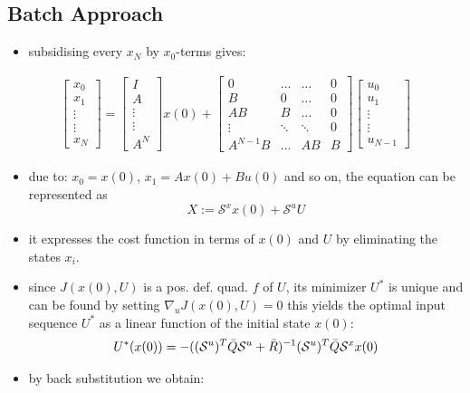 \subsection{Batch Approach}
\begin{itemize}
    \item subsidising every $x_N$ by $x_0$-terms gives:
    \end{itemize}
    \begin{align*}
        \begin{bmatrix}
            x_0     \\
            x_1     \\
            \vdots  \\
            \vdots  \\
            x_N
        \end{bmatrix} 
        =
        \begin{bmatrix}
            I \\
            A\\
            \vdots\\
            \vdots\\
            A^N
        \end{bmatrix} x(0) +
        \begin{bmatrix}
            0 & \hdots & \hdots & 0 \\
            B & 0 &\hdots & 0\\
            AB & B & \hdots & 0 \\
            \vdots & \ddots & \ddots & 0 \\ 
            A^{N-1}B & \hdots & AB & B
        \end{bmatrix}
        \begin{bmatrix}
            u_0 \\
            u_1 \\
            \vdots \\
            \vdots \\
            u_{N-1}
        \end{bmatrix}
    \end{align*}
\begin{itemize}
     \item due to: $x_0 = x(0)$, $x_1 = Ax(0) + Bu(0)$ and so on, the equation can be represented as 
     \[X:=\mathcal{S}^xx(0) + \mathcal{S}^u U\]
    \item it expresses the cost function in terms of $x(0)$ and $U$ by eliminating the states $x_i$.
    \item since $J(x(0),U)$ is a pos. def. quad. $f$ of $U$, its minimizer $U^*$ is unique and can be found by setting $\nabla_u J(x(0),U) = 0$ this yields the optimal input sequence $U^*$ as a linear function of the initial state $x(0)$: 
    \[U^*(x(0)) = - ((\mathcal{S}^u)^T\Bar{Q} \mathcal{S}^u + \Bar{R})^{-1}(\mathcal{S}^u)^T\Bar{Q}\mathcal{S}^xx(0)\]
    \item by back substitution we obtain:
\end{itemize}
